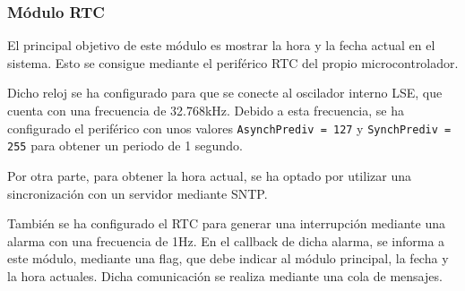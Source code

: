 \subsubsection{Módulo RTC}
El principal objetivo de este módulo es mostrar la hora y la fecha actual en el sistema. Esto se consigue mediante el periférico RTC del propio microcontrolador.

Dicho reloj se ha configurado para que se conecte al oscilador interno LSE, que cuenta con una frecuencia de 32.768kHz. Debido a esta frecuencia, se ha configurado el periférico con unos valores \texttt{AsynchPrediv = 127} y \texttt{SynchPrediv = 255} para obtener un periodo de 1 segundo.

Por otra parte, para obtener la hora actual, se ha optado por utilizar una sincronización con un servidor mediante SNTP.

También se ha configurado el RTC para generar una interrupción mediante una alarma con una frecuencia de 1Hz. En el callback de dicha alarma, se informa a este módulo, mediante una flag, que debe indicar al módulo principal, la fecha y la hora actuales. Dicha comunicación se realiza mediante una cola de mensajes.
